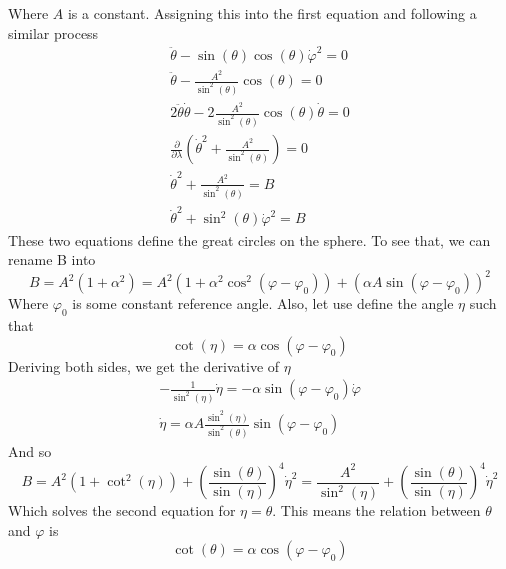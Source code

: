 \documentclass{article}
\begin{document}
Where $A$ is a constant. Assigning this into the first equation and following a similar process
\begin{equation}
\begin{gathered}
    \ddot{\theta} - \sin(\theta)\cos(\theta)\dot{\varphi}^2 = 0
    \\
    \ddot{\theta} - \frac{A^2}{\sin^2(\theta)}\cos(\theta) = 0
    \\
    2\ddot{\theta}\dot{\theta} - 2\frac{A^2}{\sin^2(\theta)}\cos(\theta)\dot{\theta} = 0
    \\
    \frac{\partial}{\partial \lambda}\left(\dot{\theta}^2 + \frac{A^2}{\sin^2(\theta)}\right) = 0
    \\
    \dot{\theta}^2 + \frac{A^2}{\sin^2(\theta)} = B
    \\
    \dot{\theta}^2 + \sin^2(\theta)\dot{\varphi}^2 = B
\end{gathered}
\end{equation}
These two equations define the great circles on the sphere. To see that, we can rename B into
\begin{equation}
    B = A^2(1+\alpha^2) = A^2\left(1 + \alpha^2\cos^2(\varphi - \varphi_0)\right) + \left(\alpha A\sin(\varphi - \varphi_0)\right)^2
\end{equation}
Where $\varphi_0$ is some constant reference angle. Also, let use define the angle $\eta$ such that
\begin{equation}
    \cot(\eta) = \alpha \cos(\varphi - \varphi_0)
\end{equation}
Deriving both sides, we get the derivative of $\eta$
\begin{equation}
\begin{gathered}
    -\frac{1}{\sin^2(\eta)}\dot{\eta} = -\alpha\sin(\varphi - \varphi_0)\dot{\varphi}
    \\
    \dot{\eta} = \alpha A \frac{\sin^2(\eta)}{\sin^2(\theta)} \sin(\varphi - \varphi_0)
\end{gathered}
\end{equation}
And so
\begin{equation}
    B = A^2\left(1 + \cot^2(\eta)\right) + \left(\frac{\sin(\theta)}{\sin(\eta)}\right)^4\dot{\eta}^2 = \frac{A^2}{\sin^2(\eta)} + \left(\frac{\sin(\theta)}{\sin(\eta)}\right)^4\dot{\eta}^2
\end{equation}
Which solves the second equation for $\eta = \theta$. This means the 
relation between $\theta$ and $\varphi$ is
\begin{equation}
    \cot(\theta) = \alpha\cos(\varphi - \varphi_0)
\end{equation}
\end{document}
